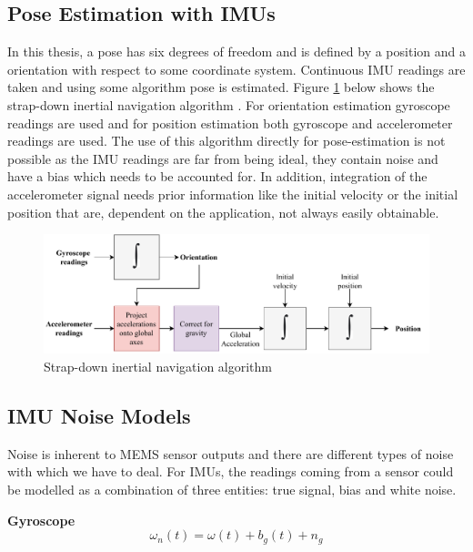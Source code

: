 \subsection{Pose Estimation with IMUs}
In this thesis, a pose has six degrees of freedom and is defined by a position and a orientation with respect to some coordinate system. Continuous IMU readings are taken and using some algorithm pose is estimated. Figure \ref{fig:strapdown_imu} below shows the strap-down inertial navigation algorithm \citep{woodman2007introduction}. For orientation estimation gyroscope readings are used and for position estimation both gyroscope and accelerometer readings are used. The use of this algorithm directly for pose-estimation is not possible as the IMU readings are far from being ideal, they contain noise and have a bias \citep{woodman2007introduction} which needs to be accounted for. In addition, integration of the accelerometer signal needs prior information like the initial velocity or the initial position that are, dependent on the application, not always easily obtainable.

\begin{figure}[H]
\includegraphics[scale=0.75]{images/fig_chapter2/strap_imu_algo.pdf}
\caption{Strap-down inertial navigation algorithm \citep{woodman2007introduction}}
\label{fig:strapdown_imu}
\end{figure}

\subsection{IMU Noise Models}
Noise is inherent to MEMS sensor outputs and there are different types of noise with which we have to deal. For IMUs, the readings coming from a sensor could be modelled as a combination of three entities: true signal, bias and white noise.

\textbf{Gyroscope}
\begin{equation}
    \omega_{n}(t) = \omega(t) + b_{g}(t) + n_{g}
\label{eqn:gyro_noise}
\end{equation}


